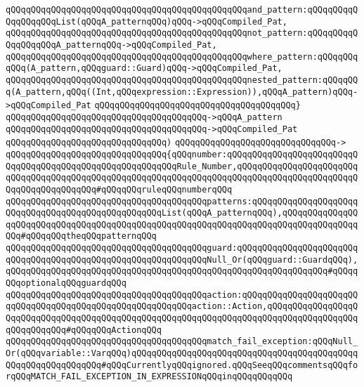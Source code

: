 \verb|qQQqqQQqqQQqqQQqqQQqqQQqqQQqqQQqqQQqqQQqqQQqqQQqand_pattern:qQQqqQQqqQQqqQQqqQQqList(qQQqA_patternqQQq)qQQq->qQQqCompiled_Pat,|\newline
\verb|qQQqqQQqqQQqqQQqqQQqqQQqqQQqqQQqqQQqqQQqqQQqqQQqnot_pattern:qQQqqQQqqQQqqQQqqQQqA_patternqQQq->qQQqCompiled_Pat,|\newline
\verb|qQQqqQQqqQQqqQQqqQQqqQQqqQQqqQQqqQQqqQQqqQQqqQQqwhere_pattern:qQQqqQQqqQQq(A_pattern,qQQqguard::Guard)qQQq->qQQqCompiled_Pat,|\newline
\verb|qQQqqQQqqQQqqQQqqQQqqQQqqQQqqQQqqQQqqQQqqQQqqQQqnested_pattern:qQQqqQQq(A_pattern,qQQq((Int,qQQqexpression::Expression)),qQQqA_pattern)qQQq->qQQqCompiled_Pat|\newline
\verb|qQQqqQQqqQQqqQQqqQQqqQQqqQQqqQQqqQQqqQQq}|\newline
\verb|qQQqqQQqqQQqqQQqqQQqqQQqqQQqqQQqqQQqqQQq->qQQqA_pattern|\newline
\verb|qQQqqQQqqQQqqQQqqQQqqQQqqQQqqQQqqQQqqQQq->qQQqCompiled_Pat|\newline
\verb|qQQqqQQqqQQqqQQqqQQqqQQqqQQqqQQq)|\newline
\verb|qQQqqQQqqQQqqQQqqQQqqQQqqQQqqQQq->|\newline
\verb|qQQqqQQqqQQqqQQqqQQqqQQqqQQqqQQq{qQQqnumber:qQQqqQQqqQQqqQQqqQQqqQQqqQQqqQQqqQQqqQQqqQQqqQQqqQQqqQQqqQQqRule_Number,qQQqqQQqqQQqqQQqqQQqqQQqqQQqqQQqqQQqqQQqqQQqqQQqqQQqqQQqqQQqqQQqqQQqqQQqqQQqqQQqqQQqqQQqqQQqqQQqqQQqqQQqqQQqqQQq#qQQqqQQqruleqQQqnumberqQQq|\newline
\verb|qQQqqQQqqQQqqQQqqQQqqQQqqQQqqQQqqQQqqQQqpatterns:qQQqqQQqqQQqqQQqqQQqqQQqqQQqqQQqqQQqqQQqqQQqqQQqqQQqList(qQQqA_patternqQQq),qQQqqQQqqQQqqQQqqQQqqQQqqQQqqQQqqQQqqQQqqQQqqQQqqQQqqQQqqQQqqQQqqQQqqQQqqQQqqQQqqQQqqQQq#qQQqqQQqtheqQQqpatternqQQq|\newline
\verb|qQQqqQQqqQQqqQQqqQQqqQQqqQQqqQQqqQQqqQQqguard:qQQqqQQqqQQqqQQqqQQqqQQqqQQqqQQqqQQqqQQqqQQqqQQqqQQqqQQqqQQqqQQqNull_Or(qQQqguard::GuardqQQq),qQQqqQQqqQQqqQQqqQQqqQQqqQQqqQQqqQQqqQQqqQQqqQQqqQQqqQQqqQQqqQQq#qQQqqQQqoptionalqQQqguardqQQq|\newline
\verb|qQQqqQQqqQQqqQQqqQQqqQQqqQQqqQQqqQQqqQQqaction:qQQqqQQqqQQqqQQqqQQqqQQqqQQqqQQqqQQqqQQqqQQqqQQqqQQqqQQqqQQqaction::Action,qQQqqQQqqQQqqQQqqQQqqQQqqQQqqQQqqQQqqQQqqQQqqQQqqQQqqQQqqQQqqQQqqQQqqQQqqQQqqQQqqQQqqQQqqQQqqQQqqQQq#qQQqqQQqActionqQQq|\newline
\verb|qQQqqQQqqQQqqQQqqQQqqQQqqQQqqQQqqQQqqQQqmatch_fail_exception:qQQqNull_Or(qQQqvariable::VarqQQq)qQQqqQQqqQQqqQQqqQQqqQQqqQQqqQQqqQQqqQQqqQQqqQQqqQQqqQQqqQQqqQQq#qQQqCurrentlyqQQqignored.qQQqSeeqQQqcommentsqQQqforqQQqMATCH_FAIL_EXCEPTION_IN_EXPRESSIONqQQqinqQQqqQQqqQQq|\newline
